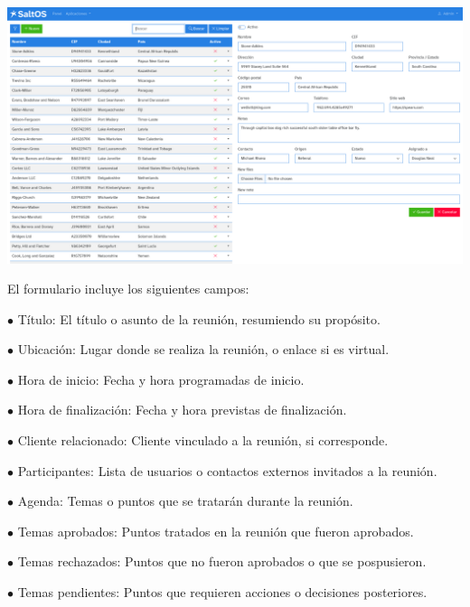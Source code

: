 \documentclass[a4paper]{article}
\begin{document}
\begin{center}\includegraphics[width=1\textwidth]{../ujest/snaps/test-screenshots-js-screenshots-crm-leads-edit-100-es-es-1-snap.png}\end{center}

El formulario incluye los siguientes campos:

\begin{compactitem}
\item[\color{myblue}$\bullet$] Título: El título o asunto de la reunión, resumiendo su propósito.
\item[\color{myblue}$\bullet$] Ubicación: Lugar donde se realiza la reunión, o enlace si es virtual.
\item[\color{myblue}$\bullet$] Hora de inicio: Fecha y hora programadas de inicio.
\item[\color{myblue}$\bullet$] Hora de finalización: Fecha y hora previstas de finalización.
\item[\color{myblue}$\bullet$] Cliente relacionado: Cliente vinculado a la reunión, si corresponde.
\item[\color{myblue}$\bullet$] Participantes: Lista de usuarios o contactos externos invitados a la reunión.
\item[\color{myblue}$\bullet$] Agenda: Temas o puntos que se tratarán durante la reunión.
\item[\color{myblue}$\bullet$] Temas aprobados: Puntos tratados en la reunión que fueron aprobados.
\item[\color{myblue}$\bullet$] Temas rechazados: Puntos que no fueron aprobados o que se pospusieron.
\item[\color{myblue}$\bullet$] Temas pendientes: Puntos que requieren acciones o decisiones posteriores.
\end{compactitem}
\end{document}
